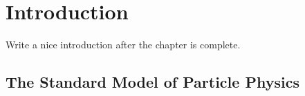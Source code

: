 
\chapter{Introduction}
\label{Introduction}

{\color{red} Write a nice introduction after the chapter is complete.}

%
%

\section{The Standard Model of Particle Physics}

